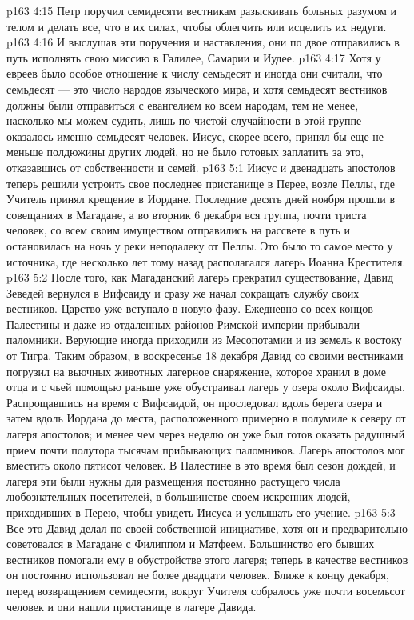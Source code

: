 \vs p163 4:15 \pc {}\bibnobreakspace {} Петр поручил семидесяти вестникам разыскивать больных разумом и телом и делать все, что в их силах, чтобы облегчить или исцелить их недуги.
\vs p163 4:16 \pc И выслушав эти поручения и наставления, они по двое отправились в путь исполнять свою миссию в Галилее, Самарии и Иудее.
\vs p163 4:17 Хотя у евреев было особое отношение к числу семьдесят и иногда они считали, что семьдесят --- это число народов языческого мира, и хотя семьдесят вестников должны были отправиться с евангелием ко всем народам, тем не менее, насколько мы можем судить, лишь по чистой случайности в этой группе оказалось именно семьдесят человек. Иисус, скорее всего, принял бы еще не меньше полдюжины других людей, но не было готовых заплатить за это, отказавшись от собственности и семей.
\vs p163 5:1 Иисус и двенадцать апостолов теперь решили устроить свое последнее пристанище в Перее, возле Пеллы, где Учитель принял крещение в Иордане. Последние десять дней ноября прошли в совещаниях в Магадане, а во вторник 6 декабря вся группа, почти триста человек, со всем своим имуществом отправились на рассвете в путь и остановилась на ночь у реки неподалеку от Пеллы. Это было то самое место у источника, где несколько лет тому назад располагался лагерь Иоанна Крестителя.
\vs p163 5:2 После того, как Магаданский лагерь прекратил существование, Давид Зеведей вернулся в Вифсаиду и сразу же начал сокращать службу своих вестников. Царство уже вступало в новую фазу. Ежедневно со всех концов Палестины и даже из отдаленных районов Римской империи прибывали паломники. Верующие иногда приходили из Месопотамии и из земель к востоку от Тигра. Таким образом, в воскресенье 18 декабря Давид со своими вестниками погрузил на вьючных животных лагерное снаряжение, которое хранил в доме отца и с чьей помощью раньше уже обустраивал лагерь у озера около Вифсаиды. Распрощавшись на время с Вифсаидой, он проследовал вдоль берега озера и затем вдоль Иордана до места, расположенного примерно в полумиле к северу от лагеря апостолов; и менее чем через неделю он уже был готов оказать радушный прием почти полутора тысячам прибывающих паломников. Лагерь апостолов мог вместить около пятисот человек. В Палестине в это время был сезон дождей, и лагеря эти были нужны для размещения постоянно растущего числа любознательных посетителей, в большинстве своем искренних людей, приходивших в Перею, чтобы увидеть Иисуса и услышать его учение.
\vs p163 5:3 Все это Давид делал по своей собственной инициативе, хотя он и предварительно советовался в Магадане с Филиппом и Матфеем. Большинство его бывших вестников помогали ему в обустройстве этого лагеря; теперь в качестве вестников он постоянно использовал не более двадцати человек. Ближе к концу декабря, перед возвращением семидесяти, вокруг Учителя собралось уже почти восемьсот человек и они нашли пристанище в лагере Давида.
